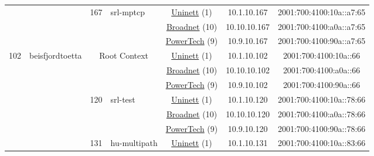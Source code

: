 \begin{small}
\begin{center}
\begin{longtable}{|c|c|c|c|c|c|c|c|}
  &  & \multirow{3}{*}{\tiny{167}} & \multicolumn{1}{|l|}{\multirow{3}{*}{\tiny{srl-mptcp}}} & \multicolumn{2}{|c|}{\tiny{\href{https://www.uninett.no}{Uninett} (1)}} & \tiny{10.1.10.167} & \tiny{2001:700:4100:10a::a7:65} \\* \cline{5-5}\cline{6-6}\cline{7-7}\cline{8-8}
  &  &  &  & \multicolumn{2}{|c|}{\tiny{\href{https://www.broadnet.no}{Broadnet} (10)}} & \tiny{10.10.10.167} & \tiny{2001:700:4100:a0a::a7:65} \\* \cline{5-5}\cline{6-6}\cline{7-7}\cline{8-8}
  &  &  &  & \multicolumn{2}{|c|}{\tiny{\href{http://www.powertech.no}{PowerTech} (9)}} & \tiny{10.9.10.167} & \tiny{2001:700:4100:90a::a7:65} \\ \hline
 \multirow{30}{*}{\tiny{102}} & \multicolumn{1}{|l|}{\multirow{30}{*}{\tiny{beisfjordtoetta}}} & \multicolumn{2}{|c|}{\multirow{3}{*}{\tiny{Root Context}}} & \multicolumn{2}{|c|}{\tiny{\href{https://www.uninett.no}{Uninett} (1)}} & \tiny{10.1.10.102} & \tiny{2001:700:4100:10a::66} \\* \cline{5-5}\cline{6-6}\cline{7-7}\cline{8-8}
  &  & \multicolumn{2}{|c|}{} & \multicolumn{2}{|c|}{\tiny{\href{https://www.broadnet.no}{Broadnet} (10)}} & \tiny{10.10.10.102} & \tiny{2001:700:4100:a0a::66} \\* \cline{5-5}\cline{6-6}\cline{7-7}\cline{8-8}
  &  & \multicolumn{2}{|c|}{} & \multicolumn{2}{|c|}{\tiny{\href{http://www.powertech.no}{PowerTech} (9)}} & \tiny{10.9.10.102} & \tiny{2001:700:4100:90a::66} \\* \cline{3-3}\cline{4-4}\cline{5-5}\cline{6-6}\cline{7-7}\cline{8-8}
  &  & \multirow{3}{*}{\tiny{120}} & \multicolumn{1}{|l|}{\multirow{3}{*}{\tiny{srl-test}}} & \multicolumn{2}{|c|}{\tiny{\href{https://www.uninett.no}{Uninett} (1)}} & \tiny{10.1.10.120} & \tiny{2001:700:4100:10a::78:66} \\* \cline{5-5}\cline{6-6}\cline{7-7}\cline{8-8}
  &  &  &  & \multicolumn{2}{|c|}{\tiny{\href{https://www.broadnet.no}{Broadnet} (10)}} & \tiny{10.10.10.120} & \tiny{2001:700:4100:a0a::78:66} \\* \cline{5-5}\cline{6-6}\cline{7-7}\cline{8-8}
  &  &  &  & \multicolumn{2}{|c|}{\tiny{\href{http://www.powertech.no}{PowerTech} (9)}} & \tiny{10.9.10.120} & \tiny{2001:700:4100:90a::78:66} \\* \cline{3-3}\cline{4-4}\cline{5-5}\cline{6-6}\cline{7-7}\cline{8-8}
  &  & \multirow{3}{*}{\tiny{131}} & \multicolumn{1}{|l|}{\multirow{3}{*}{\tiny{hu-multipath}}} & \multicolumn{2}{|c|}{\tiny{\href{https://www.uninett.no}{Uninett} (1)}} & \tiny{10.1.10.131} & \tiny{2001:700:4100:10a::83:66} \\* \cline{5-5}\cline{6-6}\cline{7-7}\cline{8-8}

\end{longtable}
\end{center}
\end{small}
